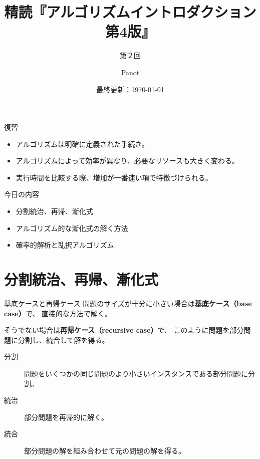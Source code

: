 \documentclass[unicode,11pt,aspectratio=169,notes]{beamer} %
\title{精読『アルゴリズムイントロダクション 第4版』}
\subtitle{第２回}
\author{Panot}
\date{最終更新：\today}
\begin{document}
\begin{frame}
  \titlepage{}
\end{frame}

\begin{frame}{復習}
  \begin{itemize}
    \item アルゴリズムは明確に定義された手続き。
    \item アルゴリズムによって効率が異なり、必要なリソースも大きく変わる。
    \item 実行時間を比較する際、増加が一番速い項で特徴づけられる。
  \end{itemize}
\end{frame}

\begin{frame}{今日の内容}
  \begin{itemize}
    \item 分割統治、再帰、漸化式
    \item アルゴリズム的な漸化式の解く方法
    \item 確率的解析と乱択アルゴリズム
  \end{itemize}
\end{frame}

\section*{分割統治、再帰、漸化式}

\begin{frame}
  \sectionpage{}
\end{frame}

\begin{frame}{基底ケースと再帰ケース}
  問題のサイズが十分に小さい場合は\textbf{基底ケース（base case）}で、
  直接的な方法で解く。

  そうでない場合は\textbf{再帰ケース（recursive case）}で、
  このように問題を部分問題に分割し、統合して解を得る。
  \begin{description}
    \item[分割] 問題をいくつかの同じ問題のより小さいインスタンスである部分問題に分割。
    \item[統治] 部分問題を再帰的に解く。
    \item[統合] 部分問題の解を組み合わせて元の問題の解を得る。
  \end{description}
\end{frame}
\end{document}
